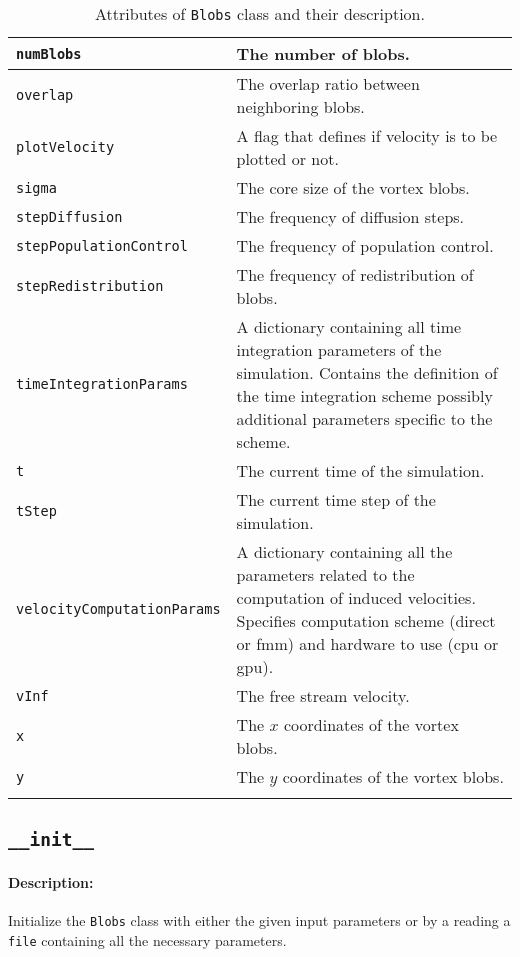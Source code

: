 \begin{longtable}{|l|p{9cm}|}
	\texttt{numBlobs} & The number of blobs.\\          \hline
	\texttt{overlap} & The overlap ratio between neighboring blobs.\\          \hline
	\texttt{plotVelocity} & A flag that defines if velocity is to be plotted or not.\\          \hline
	\texttt{sigma} & The core size of the vortex blobs.\\          \hline
	\texttt{stepDiffusion} & The frequency of diffusion steps.\\          \hline
	\texttt{stepPopulationControl} & The frequency of population control.\\          \hline
	\texttt{stepRedistribution} & The frequency of redistribution of blobs.\\          \hline
	\texttt{timeIntegrationParams} & A dictionary containing all time integration parameters of the simulation. Contains the definition of the time integration scheme possibly additional parameters specific to the scheme.\\ \hline
	\texttt{t} & The current time of the simulation.\\          \hline
	\texttt{tStep} & The current time step of the simulation.\\          \hline
	\texttt{velocityComputationParams} & A dictionary containing all the parameters related to the computation of induced velocities. Specifies computation scheme (direct or fmm) and hardware to use (cpu or gpu).\\          \hline
	\texttt{vInf} & The free stream velocity.\\          \hline
	\texttt{x} & The $x$ coordinates of the vortex blobs.\\          \hline
	\texttt{y} & The $y$ coordinates of the vortex blobs.\\          \hline	                                
    
                       
    \caption{Attributes of \texttt{Blobs} class and their description.}
    \label{tab:attributeBlobs}
\end{longtable}
\endgroup

\subsection*{\texttt{\_\_init\_\_}}
	\paragraph{Description:} Initialize the \texttt{Blobs} class with either the given input parameters or by a reading a \texttt{file} containing all the necessary parameters.\\
	

